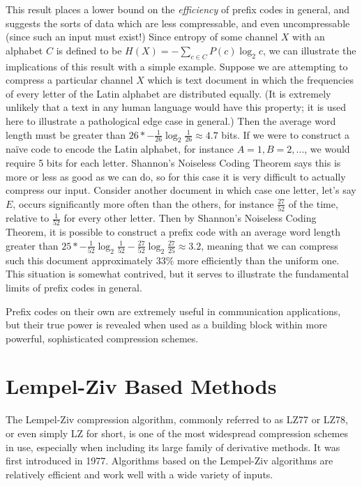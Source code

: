 \documentclass[12pt]{article}
\begin{document}
This result places a lower bound on the \emph{efficiency} of prefix
codes in general, and suggests the sorts of data which are less
compressable, and even uncompressable (since such an input must
exist!) Since entropy of some channel $X$ with an alphabet $C$ is
defined to be $H(X) = -\sum_{c \in C} P(c)\log_2{c}$, we can
illustrate the implications of this result with a simple
example. Suppose we are attempting to compress a particular channel
$X$ which is text document in which the frequencies of every letter of
the Latin alphabet are distributed equally. (It is extremely unlikely
that a text in any human language would have this property; it is used
here to illustrate a pathological edge case in general.) Then the
average word length must be greater than
$26 * -\frac{1}{26} \log_2{\frac{1}{26}} \approx 4.7$ bits. If we were
to construct a naïve code to encode the Latin alphabet, for instance
$A=1, B=2,...$, we would require 5 bits for each letter. Shannon's
Noiseless Coding Theorem says this is more or less as good as we can
do, so for this case it is very difficult to actually compress our
input. Consider another document in which case one letter, let's say
$E$, occurs significantly more often than the others, for instance
$\frac{27}{52}$ of the time, relative to $\frac{1}{52}$ for every
other letter. Then by Shannon's Noiseless Coding Theorem, it is
possible to construct a prefix code with an average word length
greater than
$25 * -\frac{1}{52} \log_2{\frac{1}{52}} - \frac{27}{52}
\log_2{\frac{27}{25}} \approx 3.2$, meaning that we can compress such
this document approximately $33\%$ more efficiently than the uniform
one. This situation is somewhat contrived, but it serves to illustrate
the fundamental limits of prefix codes in general.

Prefix codes on their own are extremely useful in communication
applications, but their true power is revealed when used as a building
block within more powerful, sophisticated compression schemes.

\section{Lempel-Ziv Based Methods}

The Lempel-Ziv compression algorithm, commonly referred to as LZ77 or
LZ78, or even simply LZ for short, is one of the most widespread
compression schemes in use, especially when including its large family
of derivative methods. It was first introduced in
1977. \cite{LempelZiv} Algorithms based on the Lempel-Ziv algorithms
are relatively efficient and work well with a wide variety of inputs.
\end{document}
